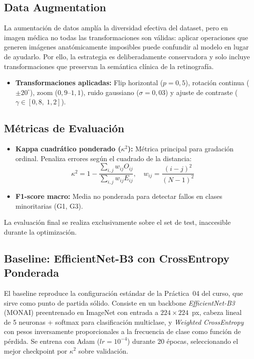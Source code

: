 \documentclass[12pt, a4paper]{article}
\begin{document}
\subsection{Data Augmentation}
La aumentación de datos amplía la diversidad efectiva del dataset, pero en imagen
médica no todas las transformaciones son válidas: aplicar operaciones que generen
imágenes anatómicamente imposibles puede confundir al modelo en lugar de ayudarlo.
Por ello, la estrategia es deliberadamente conservadora y solo incluye
transformaciones que preservan la semántica clínica de la retinografía.

\begin{itemize}
    \item \textbf{Transformaciones aplicadas:} Flip horizontal ($p=0{,}5$),
          rotación continua ($\pm 20^\circ$), zoom ($0{,}9$--$1{,}1$), ruido
          gaussiano ($\sigma=0{,}03$) y ajuste de contraste
          ($\gamma \in [0{,}8,\; 1{,}2]$).
\end{itemize}

\subsection{Métricas de Evaluación}
\begin{itemize}
    \item \textbf{Kappa cuadrático ponderado ($\kappa^2$):} Métrica principal para gradación ordinal. Penaliza errores según el cuadrado de la distancia:
    \begin{equation}
    \kappa^2 = 1 - \frac{\sum_{i,j} w_{ij} O_{ij}}{\sum_{i,j} w_{ij} E_{ij}}, \quad w_{ij} = \frac{(i-j)^2}{(N-1)^2}
    \end{equation}
    \item \textbf{F1-score macro:} Media no ponderada para detectar fallos en clases minoritarias (G1, G3).
\end{itemize}
La evaluación final se realiza exclusivamente sobre el set de test, inaccesible durante la optimización.

\subsection{Baseline: EfficientNet-B3 con CrossEntropy Ponderada}
El baseline reproduce la configuración estándar de la Práctica~04 del curso,
que sirve como punto de partida sólido. Consiste en un backbone
\textit{EfficientNet-B3} (MONAI) preentrenado en ImageNet con entrada a
$224{\times}224$~px, cabeza lineal de 5 neuronas + softmax para clasificación
multiclase, y \textit{Weighted CrossEntropy} con pesos inversamente
proporcionales a la frecuencia de clase como función de pérdida. Se entrena
con Adam ($lr=10^{-4}$) durante 20 épocas, seleccionando el mejor checkpoint
por $\kappa^2$ sobre validación.
\end{document}

